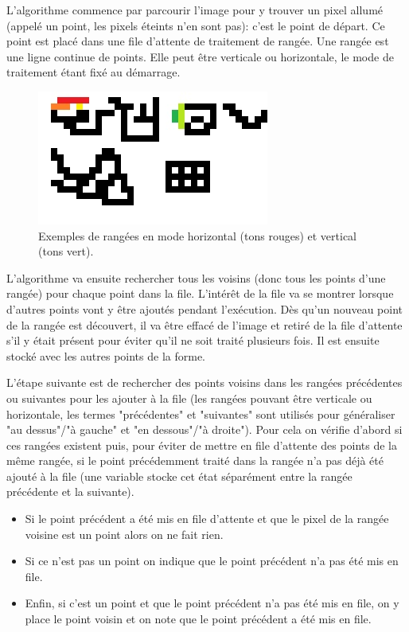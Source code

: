 \documentclass[a4paper, 12pt]{article}
\begin{document}
L'algorithme commence par parcourir l'image pour y trouver un pixel allumé (appelé un point, les pixels éteints n'en sont pas): c'est le point de départ. Ce point est placé dans une file d'attente de traitement de rangée. Une rangée est une ligne continue de points. Elle peut être verticale ou horizontale, le mode de traitement étant fixé au démarrage.

\begin{figure}[!ht]
\centering
\includegraphics[scale=1]{img/shape_row.jpg}
\caption{Exemples de rangées en mode horizontal (tons rouges) et vertical (tons vert).}
\end{figure}

L'algorithme va ensuite rechercher tous les voisins (donc tous les points d'une rangée) pour chaque point dans la file. L’intérêt de la file va se montrer lorsque d'autres points vont y être ajoutés pendant l'exécution. Dès qu'un nouveau point de la rangée est découvert, il va être effacé de l'image et retiré de la file d'attente s'il y était présent pour éviter qu'il ne soit traité plusieurs fois. Il est ensuite stocké avec les autres points de la forme.

L'étape suivante est de rechercher des points voisins dans les rangées précédentes ou suivantes pour les ajouter à la file (les rangées pouvant être verticale ou horizontale, les termes "précédentes" et "suivantes" sont utilisés pour généraliser "au dessus"/"à gauche" et "en dessous"/"à droite"). Pour cela on vérifie d'abord si ces rangées existent puis, pour éviter de mettre en file d'attente des points de la même rangée, si le point précédemment traité dans la rangée n'a pas déjà été ajouté à la file (une variable stocke cet état séparément entre la rangée précédente et la suivante).
\begin{itemize}
\item Si le point précédent a été mis en file d'attente et que le pixel de la rangée voisine est un point alors on ne fait rien.
\item Si ce n'est pas un point on indique que le point précédent n'a pas été mis en file.
\item Enfin, si c'est un point et que le point précédent n'a pas été mis en file, on y place le point voisin et on note que le point précédent a été mis en file.
\end{itemize}
\end{document}
